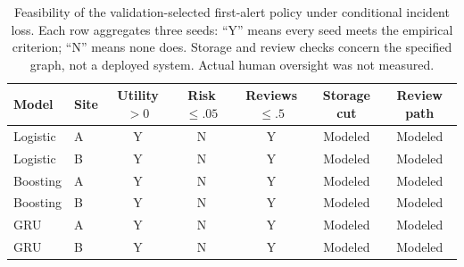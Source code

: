 \begin{table}[t]\centering\small
\caption{Feasibility of the validation-selected first-alert policy under conditional incident loss. Each row aggregates three seeds: ``Y'' means every seed meets the empirical criterion; ``N'' means none does. Storage and review checks concern the specified graph, not a deployed system. Actual human oversight was not measured.}

\begin{tabular}{llccccc}\toprule
Model & Site & Utility $>0$ & Risk $\le .05$ & Reviews $\le .5$ & Storage cut & Review path\\\midrule
Logistic & A & Y & N & Y & Modeled & Modeled \\
Logistic & B & Y & N & Y & Modeled & Modeled \\
Boosting & A & Y & N & Y & Modeled & Modeled \\
Boosting & B & Y & N & Y & Modeled & Modeled \\
GRU & A & Y & N & Y & Modeled & Modeled \\
GRU & B & Y & N & Y & Modeled & Modeled \\
\bottomrule\end{tabular}\end{table}
